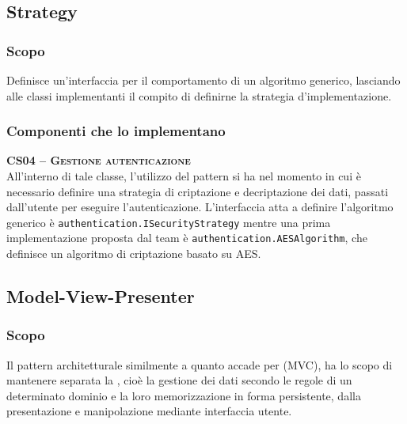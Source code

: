 \subsection{Strategy}\label{sec:patternstrategy}

\subsubsection{Scopo}
Definisce un'interfaccia per il comportamento di un algoritmo generico, lasciando alle classi implementanti il compito di definirne la strategia d'implementazione.

\subsubsection{Componenti che lo implementano}
\begin{description}

  \item{\scshape\bfseries CS04 -- Gestione autenticazione}\\
All'interno di tale classe, l'utilizzo del pattern si ha nel momento in cui è necessario definire una strategia di criptazione e decriptazione dei dati, passati dall'utente per eseguire l'autenticazione. L'interfaccia atta a definire l'algoritmo generico è \texttt{authentication.ISecurityStrategy} mentre una prima implementazione proposta dal team è \texttt{authentication.AESAlgorithm}, che definisce un algoritmo di criptazione basato su AES.


\end{description}

\subsection{Model-View-Presenter}\label{sec:MVP}

\subsubsection{Scopo}
Il pattern architetturale  similmente a quanto accade per  (MVC), ha lo scopo di mantenere separata la , cioè la gestione dei dati secondo le regole di un determinato dominio e la loro memorizzazione in forma persistente, dalla presentazione e manipolazione mediante interfaccia utente.


